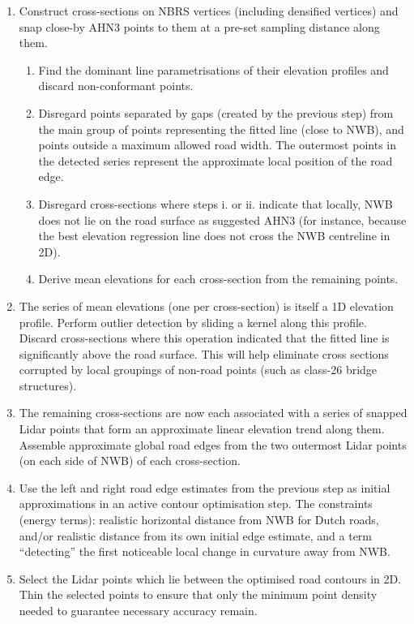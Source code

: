 \begin{enumerate}
        \begin{enumerate}
            \item Construct cross-sections on NBRS vertices (including densified vertices) and snap close-by AHN3 points to them at a pre-set sampling distance along them.
            \begin{enumerate}
                \item Find the dominant line parametrisations of their elevation profiles and discard non-conformant points.
                \item Disregard points separated by gaps (created by the previous step) from the main group of points representing the fitted line (close to NWB), and points outside a maximum allowed road width. The outermost points in the detected series represent the approximate local position of the road edge.
                \item Disregard cross-sections where steps i. or ii. indicate that locally, NWB does not lie on the road surface as suggested AHN3 (for instance, because the best elevation regression line does not cross the NWB centreline in 2D).
                \item Derive mean elevations for each cross-section from the remaining points.
            \end{enumerate}
            \item The series of mean elevations (one per cross-section) is itself a 1D elevation profile. Perform outlier detection by sliding a kernel along this profile. Discard cross-sections where this operation indicated that the fitted line is significantly above the road surface. This will help eliminate cross sections corrupted by local groupings of non-road points (such as class-26 bridge structures).
            \item The remaining cross-sections are now each associated with a series of snapped Lidar points that form an approximate linear elevation trend along them. Assemble approximate global road edges from the two outermost Lidar points (on each side of NWB) of each cross-section.
            \item Use the left and right road edge estimates from the previous step as initial approximations in an active contour optimisation step. The constraints (energy terms): realistic horizontal distance from NWB for Dutch roads, and/or realistic distance from its own initial edge estimate, and a term “detecting” the first noticeable local change in curvature away from NWB.
            \item Select the Lidar points which lie between the optimised road contours in 2D. Thin the selected points to ensure that only the minimum point density needed to guarantee necessary accuracy remain.

\end{enumerate}
\end{enumerate}
